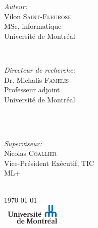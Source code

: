 \documentclass[12pt, french]{article}
\begin{document}
\begin{titlepage}
		\begin{minipage}{0.4\textwidth}
			\begin{flushleft} \large
				\emph{Auteur:}\\
				Vilon \textsc{Saint-Fleurose} %
				\\MSc, informatique \\Université de Montréal
			\end{flushleft}
		\end{minipage}
		~
		\begin{minipage}{0.4\textwidth}
			\begin{flushright} \large
				\emph{Directeur de recherche:} \\
				Dr. Michalis \textsc{Famelis} %
				\\Professeur adjoint \\Université de Montréal
			\end{flushright}
		\end{minipage}\\[1cm]
			~
			\begin{minipage}{0.4\textwidth}
				\begin{center} \large
					\emph{Superviseur:} \\
					 Nicolas \textsc{Coallier} %
					\\Vice-Président Exécutif, TIC \\ML+
				\end{center}
			\end{minipage}\\[1cm]
		
		
		
		{\large \today}\\[1cm] %
		
		
		\includegraphics[width=3cm, height=1cm]{images/logo.png} %
		
		
		\vfill %
		
	\end{titlepage}
		
\end{document}
